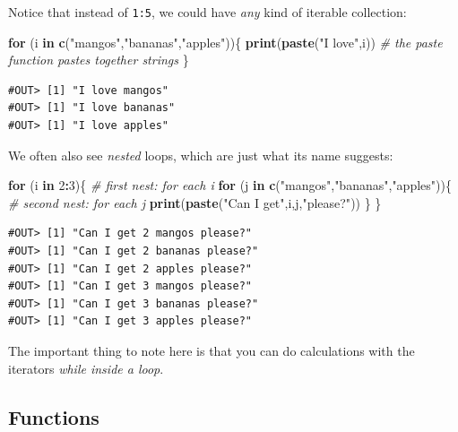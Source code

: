 \documentclass[]{book}
\newenvironment{Shaded}{\begin{snugshade}}{\end{snugshade}}
\newcommand{\KeywordTok}[1]{\textcolor[rgb]{0.13,0.29,0.53}{\textbf{#1}}}
\newcommand{\DecValTok}[1]{\textcolor[rgb]{0.00,0.00,0.81}{#1}}
\newcommand{\StringTok}[1]{\textcolor[rgb]{0.31,0.60,0.02}{#1}}
\newcommand{\CommentTok}[1]{\textcolor[rgb]{0.56,0.35,0.01}{\textit{#1}}}
\newcommand{\ControlFlowTok}[1]{\textcolor[rgb]{0.13,0.29,0.53}{\textbf{#1}}}
\newcommand{\OperatorTok}[1]{\textcolor[rgb]{0.81,0.36,0.00}{\textbf{#1}}}
\newcommand{\NormalTok}[1]{#1}
\theoremstyle{definition}
\theoremstyle{definition}
\theoremstyle{definition}
\theoremstyle{remark}
\begin{document}
Notice that instead of \texttt{1:5}, we could have \emph{any} kind of
iterable collection:

\begin{Shaded}
\begin{Highlighting}[]
\ControlFlowTok{for}\NormalTok{ (i }\ControlFlowTok{in} \KeywordTok{c}\NormalTok{(}\StringTok{"mangos"}\NormalTok{,}\StringTok{"bananas"}\NormalTok{,}\StringTok{"apples"}\NormalTok{))\{}
  \KeywordTok{print}\NormalTok{(}\KeywordTok{paste}\NormalTok{(}\StringTok{"I love"}\NormalTok{,i))  }\CommentTok{# the paste function pastes together strings}
\NormalTok{\}}
\end{Highlighting}
\end{Shaded}

\begin{verbatim}
#OUT> [1] "I love mangos"
#OUT> [1] "I love bananas"
#OUT> [1] "I love apples"
\end{verbatim}

We often also see \emph{nested} loops, which are just what its name
suggests:

\begin{Shaded}
\begin{Highlighting}[]
\ControlFlowTok{for}\NormalTok{ (i }\ControlFlowTok{in} \DecValTok{2}\OperatorTok{:}\DecValTok{3}\NormalTok{)\{}
  \CommentTok{# first nest: for each i}
  \ControlFlowTok{for}\NormalTok{ (j }\ControlFlowTok{in} \KeywordTok{c}\NormalTok{(}\StringTok{"mangos"}\NormalTok{,}\StringTok{"bananas"}\NormalTok{,}\StringTok{"apples"}\NormalTok{))\{}
    \CommentTok{# second nest: for each j}
    \KeywordTok{print}\NormalTok{(}\KeywordTok{paste}\NormalTok{(}\StringTok{"Can I get"}\NormalTok{,i,j,}\StringTok{"please?"}\NormalTok{))}
\NormalTok{  \}}
\NormalTok{\}}
\end{Highlighting}
\end{Shaded}

\begin{verbatim}
#OUT> [1] "Can I get 2 mangos please?"
#OUT> [1] "Can I get 2 bananas please?"
#OUT> [1] "Can I get 2 apples please?"
#OUT> [1] "Can I get 3 mangos please?"
#OUT> [1] "Can I get 3 bananas please?"
#OUT> [1] "Can I get 3 apples please?"
\end{verbatim}

The important thing to note here is that you can do calculations with
the iterators \emph{while inside a loop}.

\subsection{Functions}\label{functions}
\end{document}
